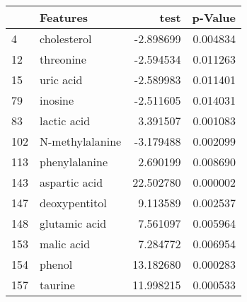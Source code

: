 \begin{tabular}{llrr}
\toprule
{} &         Features &       test &   p-Value \\
\midrule
4   &      cholesterol &  -2.898699 &  0.004834 \\
12  &        threonine &  -2.594534 &  0.011263 \\
15  &        uric acid &  -2.589983 &  0.011401 \\
79  &          inosine &  -2.511605 &  0.014031 \\
83  &      lactic acid &   3.391507 &  0.001083 \\
102 &  N-methylalanine &  -3.179488 &  0.002099 \\
113 &    phenylalanine &   2.690199 &  0.008690 \\
143 &    aspartic acid &  22.502780 &  0.000002 \\
147 &    deoxypentitol &   9.113589 &  0.002537 \\
148 &    glutamic acid &   7.561097 &  0.005964 \\
153 &       malic acid &   7.284772 &  0.006954 \\
154 &           phenol &  13.182680 &  0.000283 \\
157 &          taurine &  11.998215 &  0.000533 \\
\bottomrule
\end{tabular}
